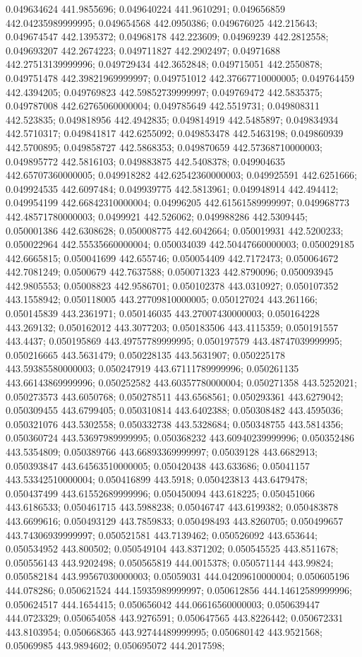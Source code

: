 0.049634624 441.9855696; 0.049640224 441.9610291; 0.049656859 442.04235989999995; 0.049654568 442.0950386; 0.049676025 442.215643; 0.049674547 442.1395372; 0.04968178 442.223609; 0.04969239 442.2812558; 0.049693207 442.2674223; 0.049711827 442.2902497; 0.04971688 442.27513139999996; 0.049729434 442.3652848; 0.049715051 442.2550878; 0.049751478 442.39821969999997; 0.049751012 442.37667710000005; 0.049764459 442.4394205; 0.049769823 442.59852739999997; 0.049769472 442.5835375; 0.049787008 442.62765060000004; 0.049785649 442.5519731; 0.049808311 442.523835; 0.049818956 442.4942835; 0.049814919 442.5485897; 0.049834934 442.5710317; 0.049841817 442.6255092; 0.049853478 442.5463198; 0.049860939 442.5700895; 0.049858727 442.5868353; 0.049870659 442.57368710000003; 0.049895772 442.5816103; 0.049883875 442.5408378; 0.049904635 442.65707360000005; 0.049918282 442.62542360000003; 0.049925591 442.6251666; 0.049924535 442.6097484; 0.049939775 442.5813961; 0.049948914 442.494412; 0.049954199 442.66842310000004; 0.04996205 442.61561589999997; 0.049968773 442.48571780000003; 0.0499921 442.526062; 0.049988286 442.5309445; 0.050001386 442.6308628; 0.050008775 442.6042664; 0.050019931 442.5200233; 0.050022964 442.55535660000004; 0.050034039 442.50447660000003; 0.050029185 442.6665815; 0.050041699 442.655746; 0.050054409 442.7172473; 0.050064672 442.7081249; 0.0500679 442.7637588; 0.050071323 442.8790096; 0.050093945 442.9805553; 0.05008823 442.9586701; 0.050102378 443.0310927; 0.050107352 443.1558942; 0.050118005 443.27709810000005; 0.050127024 443.261166; 0.050145839 443.2361971; 0.050146035 443.27007430000003; 0.050164228 443.269132; 0.050162012 443.3077203; 0.050183506 443.4115359; 0.050191557 443.4437; 0.050195869 443.49757789999995; 0.050197579 443.48747039999995; 0.050216665 443.5631479; 0.050228135 443.5631907; 0.050225178 443.59385580000003; 0.050247919 443.67111789999996; 0.050261135 443.66143869999996; 0.050252582 443.60357780000004; 0.050271358 443.5252021; 0.050273573 443.6050768; 0.050278511 443.6568561; 0.050293361 443.6279042; 0.050309455 443.6799405; 0.050310814 443.6402388; 0.050308482 443.4595036; 0.050321076 443.5302558; 0.050332738 443.5328684; 0.050348755 443.5814356; 0.050360724 443.53697989999995; 0.050368232 443.60940239999996; 0.050352486 443.5354809; 0.050389766 443.66893369999997; 0.05039128 443.6682913; 0.050393847 443.64563510000005; 0.050420438 443.633686; 0.05041157 443.53342510000004; 0.050416899 443.5918; 0.050423813 443.6479478; 0.050437499 443.61552689999996; 0.050450094 443.618225; 0.050451066 443.6186533; 0.050461715 443.5988238; 0.05046747 443.6199382; 0.050483878 443.6699616; 0.050493129 443.7859833; 0.050498493 443.8260705; 0.050499657 443.74306939999997; 0.050521581 443.7139462; 0.050526092 443.653644; 0.050534952 443.800502; 0.050549104 443.8371202; 0.050545525 443.8511678; 0.050556143 443.9202498; 0.050565819 444.0015378; 0.050571144 443.99824; 0.050582184 443.99567030000003; 0.05059031 444.04209610000004; 0.050605196 444.078286; 0.050621524 444.15935989999997; 0.050612856 444.14612589999996; 0.050624517 444.1654415; 0.050656042 444.06616560000003; 0.050639447 444.0723329; 0.050654058 443.9276591; 0.050647565 443.8226442; 0.050672331 443.8103954; 0.050668365 443.92744489999995; 0.050680142 443.9521568; 0.05069985 443.9894602; 0.050695072 444.2017598; 